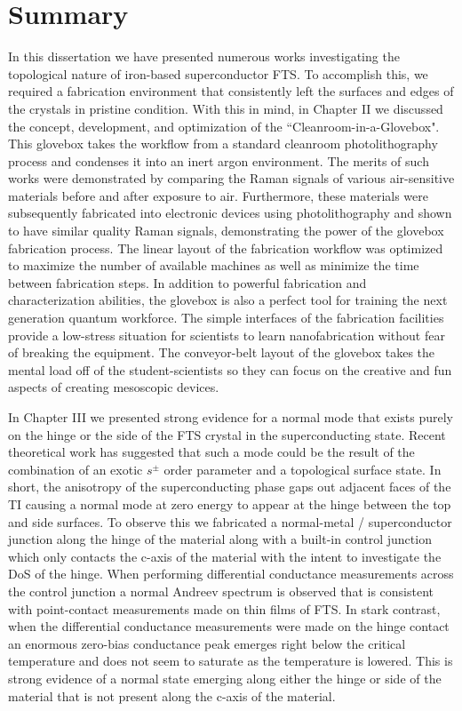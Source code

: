 \section{Summary}
In this dissertation we have presented numerous works investigating the topological nature of iron-based superconductor \acl{FTS}. To accomplish this, we required a fabrication environment that consistently left the surfaces and edges of the crystals in pristine condition. With this in mind, in Chapter II we discussed the concept, development, and optimization of the ``Cleanroom-in-a-Glovebox". This glovebox takes the workflow from a standard cleanroom photolithography process and condenses it into an inert argon environment. The merits of such works were demonstrated by comparing the Raman signals of various air-sensitive materials before and after exposure to air. Furthermore, these materials were subsequently fabricated into electronic devices using photolithography and shown to have similar quality Raman signals, demonstrating the power of the glovebox fabrication process. The linear layout of the fabrication workflow was optimized to maximize the number of available machines as well as minimize the time between fabrication steps. In addition to powerful fabrication and characterization abilities, the glovebox is also a perfect tool for training the next generation quantum workforce. The simple interfaces of the fabrication facilities provide a low-stress situation for scientists to learn nanofabrication without fear of breaking the equipment. The conveyor-belt layout of the glovebox takes the mental load off of the student-scientists so they can focus on the creative and fun aspects of creating mesoscopic devices.\par
In Chapter III we presented strong evidence for a normal mode that exists purely on the hinge or the side of the \ac{FTS} crystal in the superconducting state. Recent theoretical work has suggested that such a mode could be the result of the combination of an exotic $s^{\pm}$ order parameter and a topological surface state. In short, the anisotropy of the superconducting phase gaps out adjacent faces of the \ac{TI} causing a normal mode at zero energy to appear at the hinge between the top and side surfaces. To observe this we fabricated a normal-metal / superconductor junction along the hinge of the material along with a built-in control junction which only contacts the c-axis of the material with the intent to investigate the \ac{DoS} of the hinge. When performing differential conductance measurements across the control junction a normal Andreev spectrum is observed that is consistent with point-contact measurements made on thin films of \ac{FTS}. In stark contrast, when the differential conductance measurements were made on the hinge contact an enormous zero-bias conductance peak emerges right below the critical temperature and does not seem to saturate as the temperature is lowered. This is strong evidence of a normal state emerging along either the hinge or side of the material that is not present along the c-axis of the material.\par
